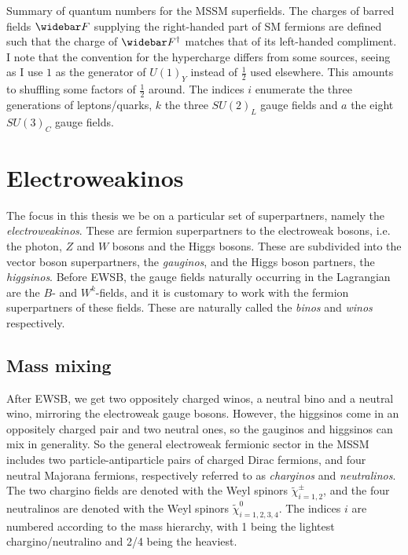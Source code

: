 \documentclass[../main.tex]{subfiles}
\begin{document}
{\begin{table}[ht!]
  \caption{Summary of quantum numbers for the MSSM superfields.
    The charges of barred fields \(\wbar{F}\) supplying the right-handed part of SM fermions are defined such that the charge of \(\wbar{F}^\dagger\) matches that of its left-handed compliment.
    I note that the convention for the hypercharge differs from some sources, seeing as I use \(1\) as the generator of \(U(1)_Y\) instead of \(\frac{1}{2}\) used elsewhere.
    This amounts to shuffling some factors of \(\frac{1}{2}\) around.
    The indices \(i\) enumerate the three generations of leptons/quarks, \(k\) the three \(SU(2)_L\) gauge fields and \(a\) the eight \(SU(3)_C\) gauge fields.}
  \label{susy:tab:mssm_quantum_numbers}
\end{table}
}




\section{Electroweakinos}

The focus in this thesis we be on a particular set of superpartners, namely the \emph{electroweakinos}.
These are fermion superpartners to the electroweak bosons, i.e. the photon, \(Z\) and \(W\) bosons and the Higgs bosons.
These are subdivided into the vector boson superpartners, the \emph{gauginos}, and the Higgs boson partners, the \emph{higgsinos}.
Before EWSB, the gauge fields naturally occurring in the Lagrangian are the \(B\)- and \(W^k\)-fields, and it is customary to work with the fermion superpartners of these fields.
These are naturally called the \emph{binos} and \emph{winos} respectively.

\subsection{Mass mixing}
After EWSB, we get two oppositely charged winos, a neutral bino and a neutral wino, mirroring the electroweak gauge bosons.
However, the higgsinos come in an oppositely charged pair and two neutral ones, so the gauginos and higgsinos can mix in generality.
So the general electroweak fermionic sector in the MSSM includes two particle-antiparticle pairs of charged Dirac fermions, and four neutral Majorana fermions, respectively referred to as \emph{charginos} and \emph{neutralinos}.
The two chargino fields are denoted with the Weyl spinors \(\tilde\chi_{i=1,2}^\pm\), and the four neutralinos are denoted with the Weyl spinors \(\tilde\chi_{i=1,2,3,4}^0\).
The indices \(i\) are numbered according to the mass hierarchy, with 1 being the lightest chargino/neutralino and 2/4 being the heaviest.
\end{document}
